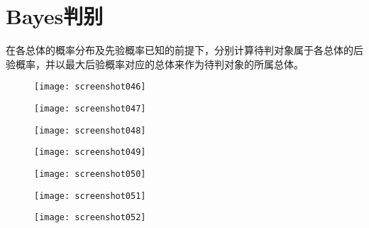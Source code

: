 \documentclass[11pt,a4paper,oneside]{book}
\begin{document}
\section{Bayes判别}
在各总体的概率分布及先验概率已知的前提下，分别计算待判对象属于各总体的后验概率，并以最大后验概率对应的总体来作为待判对象的所属总体。
\begin{figure}[H]
	\centering
	\texttt{[image: screenshot046]}
\end{figure}
\begin{figure}[H]
	\centering
	\texttt{[image: screenshot047]}
\end{figure}
\begin{figure}[H]
	\centering
	\texttt{[image: screenshot048]}
\end{figure}
\begin{figure}[H]
	\centering
	\texttt{[image: screenshot049]}
\end{figure}
\begin{figure}[H]
	\centering
	\texttt{[image: screenshot050]}
\end{figure}
\begin{figure}[H]
	\centering
	\texttt{[image: screenshot051]}
\end{figure}
\begin{figure}[H]
	\centering
	\texttt{[image: screenshot052]}
\end{figure}
\end{document}
